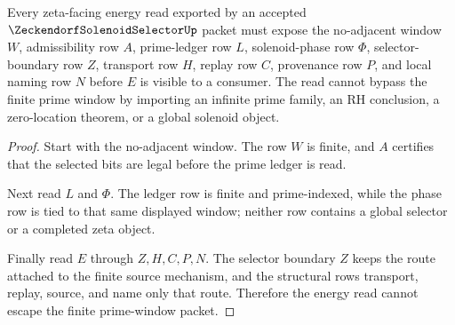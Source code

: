 \begin{theorem}
\label{thm:zeckendorf-solenoid-selector-prime-window-nonescape}
Every zeta-facing energy read exported by an accepted
$\ZeckendorfSolenoidSelectorUp$ packet must expose the no-adjacent window
$W$, admissibility row $A$, prime-ledger row $L$, solenoid-phase row $\Phi$,
selector-boundary row $Z$, transport row $H$, replay row $C$, provenance row
$P$, and local naming row $N$ before $E$ is visible to a consumer. The read
cannot bypass the finite prime window by importing an infinite prime family,
an RH conclusion, a zero-location theorem, or a global solenoid object.
\end{theorem}
\begin{proof}
Start with the no-adjacent window. The row $W$ is finite, and $A$ certifies
that the selected bits are legal before the prime ledger is read.

Next read $L$ and $\Phi$. The ledger row is finite and prime-indexed, while
the phase row is tied to that same displayed window; neither row contains a
global selector or a completed zeta object.

Finally read $E$ through $Z,H,C,P,N$. The selector boundary $Z$ keeps the
route attached to the finite source mechanism, and the structural rows
transport, replay, source, and name only that route. Therefore the energy read
cannot escape the finite prime-window packet.
\end{proof}




